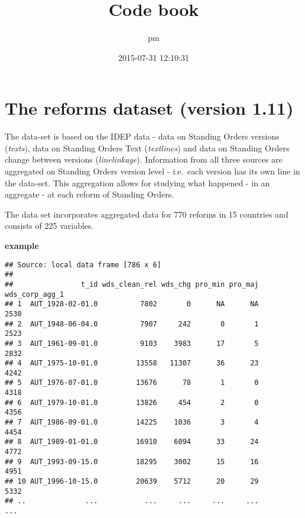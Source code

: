 \documentclass[]{article}
\title{Code book}
\author{pm}
\date{2015-07-31 12:10:31}
\newenvironment{Shaded}{\begin{snugshade}}{\end{snugshade}}
\newcommand{\KeywordTok}[1]{\textcolor[rgb]{0.13,0.29,0.53}{\textbf{{#1}}}}
\newcommand{\StringTok}[1]{\textcolor[rgb]{0.31,0.60,0.02}{{#1}}}
\newcommand{\NormalTok}[1]{{#1}}
\begin{document}
\maketitle


\section{The reforms dataset (version
1.11)}\label{the-reforms-dataset-version-1.11}

The data-set is based on the IDEP data - data on Standing Orders
versions (\emph{texts}), data on Standing Orders Text (\emph{textlines})
and data on Standing Orders change between versions
(\emph{linelinkage}). Information from all three sources are aggregated
on Standing Orders version level - i.e.~each version has its own line in
the data-set. This aggregation allows for studying what happened - in an
aggregate - at each reform of Standing Orders.

The data set incorporates aggregated data for 770 reforms in 15
countries and consists of 225 variables.

\textbf{example}

\begin{Shaded}
\end{Shaded}

\begin{verbatim}
## Source: local data frame [786 x 6]
## 
##                t_id wds_clean_rel wds_chg pro_min pro_maj wds_corp_agg_1
## 1  AUT_1928-02-01.0          7802       0      NA      NA           2530
## 2  AUT_1948-06-04.0          7907     242       0       1           2523
## 3  AUT_1961-09-01.0          9103    3983      17       5           2832
## 4  AUT_1975-10-01.0         13558   11307      36      23           4242
## 5  AUT_1976-07-01.0         13676      78       1       0           4318
## 6  AUT_1979-10-01.0         13826     454       2       0           4356
## 7  AUT_1986-09-01.0         14225    1036       3       4           4454
## 8  AUT_1989-01-01.0         16910    6094      33      24           4772
## 9  AUT_1993-09-15.0         18295    3002      15      16           4951
## 10 AUT_1996-10-15.0         20639    5712      20      29           5332
## ..              ...           ...     ...     ...     ...            ...
\end{verbatim}
\end{document}
